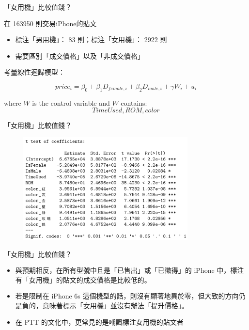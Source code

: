 \documentclass[11pt]{beamer}
\begin{document}
\begin{frame}[fragile]{「女用機」比較值錢？}

在 163950 則交易iPhone的貼文

	\begin{itemize}
		\item 標注「男用機」： 83 則；標注「女用機」： 2922 則
		\item 需要區別「成交價格」以及「非成交價格」
	\end{itemize}

考量線性迴歸模型：

$$price_i = \beta_0 + \beta_1 D_{female, i} + \beta_2 D_{male, i} + \gamma W_i + u_i$$

where $W$ is the control variable and $W$ contains: $$TimeUsed, ROM, color$$

\end{frame}


\begin{frame}[fragile]{「女用機」比較值錢？}

	\begin{figure}
		\begin{center}
			\includegraphics[width=0.8\textwidth]{figure/f01.png}
		\end{center}
	\end{figure}

\end{frame}


\begin{frame}[fragile]{「女用機」比較值錢？}

	\begin{itemize}
		\item 與預期相反，在所有型號中且是「已售出」或「已徵得」的 iPhone 中，標注有「女用機」的貼文的成交價格是比較低的。
		\item 若是限制在 iPhone 6s 這個機型的話，則沒有顯著地異於零，但大致的方向仍是負的，意味著標示「女用機」並沒有辦法「提升價格」。
		\item 在 PTT 的文化中，更常見的是嘲諷標注女用機的貼文者
	\end{itemize}

\end{frame}
\end{document}
